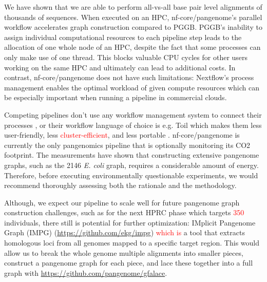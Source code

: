 \documentclass{bioinfo}
\theoremstyle{definition}
\newcommand{\red}[1]{{\textcolor{Red}{#1}}}
\begin{document}
	We have shown that we are able to perform all-vs-all base pair level alignments of thousands of sequences. 
	When executed on an HPC, nf-core/pangenome’s parallel workflow accelerates graph construction compared to PGGB. 
	PGGB’s inability to assign individual computational resources to each pipeline step leads to the allocation of one whole node of an HPC, despite the fact that some processes can only make use of one thread. 
	This blocks valuable CPU cycles for other users working on the same HPC and ultimately can lead to additional costs.
	In contrast, %
	nf-core/pangenome does not have such limitations: 
	Nextflow’s process management enables the optimal workload of given compute resources which can be especially important when running a pipeline in commercial clouds. %
	
	Competing pipelines don’t use any workflow management system to connect their processes \citep{Chin2023}, or their workflow language of choice is e.g. Toil \citep{Vivian2017, Hickey2023} which makes them less user-friendly, less \red{cluster-efficient}, and less portable \citep{Wratten2021}.
	nf-core/pangenome is currently the only pangenomics pipeline that is optionally monitoring its CO2 footprint. 
	The measurements have shown that constructing extensive pangenome graphs, such as the 2146 \textit{E. coli} graph, requires a considerable amount of energy. 
	Therefore, before executing environmentally questionable experiments, we would recommend thoroughly assessing both the rationale and the methodology. 
	
	Although, we expect our pipeline to scale well for future pangenome graph construction challenges, such as for the next HPRC phase which targets \red{350} individuals, there still is potential for further optimization: 
	IMplicit Pangenome Graph (IMPG) (\href{https://github.com/ekg/impg}{https://github.com/ekg/impg}) \red{which is} a tool that extracts homologous loci from all genomes mapped to a specific target region. 
	This would allow us to break the whole genome multiple alignments into smaller pieces, construct a pangenome graph for each piece, and lace these together into a full graph with \href{https://github.com/pangenome/gfalace}{https://github.com/pangenome/gfalace}. 
	
\end{document}
